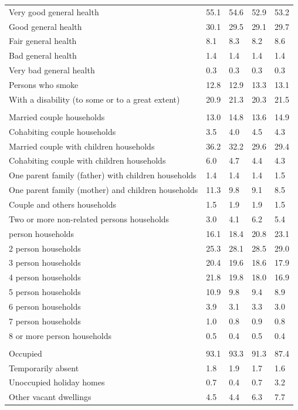 \documentclass{article}
\begin{document}
\begin{table}[h]
\begin{tabular}{KTTTT}
    \hline
Very good general health & 55.1& 54.6&52.9& 53.2\\
Good general health & 30.1& 29.5& 29.1& 29.7\\
Fair general health & 8.1& 8.3&8.2& 8.6\\
Bad general health & 1.4& 1.4&1.4& 1.4\\
Very bad general health & 0.3& 0.3&0.3& 0.3\\
    \hline
Persons who smoke & 12.8& 12.9&13.3& 13.1\\
    \hline
With a disability (to some or to a great extent) & 20.9& 21.3&20.3& 21.5\\
\hline
    \\ 
    \hline
Married couple households & 13.0& 14.8& 13.6& 14.9\\
Cohabiting couple households & 3.5& 4.0& 4.5& 4.3\\
Married couple with children households & 36.2& 32.2& 29.6& 29.4\\
Cohabiting couple with children households & 6.0& 4.7& 4.4& 4.3\\
One parent family (father) with  children households & 1.4& 1.4& 1.4& 1.5\\
One parent family (mother) and children households & 11.3&  9.8&  9.1&  8.5\\
Couple and others households  & 1.5& 1.9& 1.9& 1.5\\
Two or more non-related persons households & 3.0& 4.1& 6.2& 5.4\\
     person households & 16.1& 18.4& 20.8& 23.1\\
2 person households & 25.3& 28.1& 28.5& 29.0\\
3 person households & 20.4& 19.6& 18.6& 17.9\\
4 person households & 21.8& 19.8& 18.0& 16.9\\
5 person households & 10.9&  9.8&  9.4&  8.9\\
6 person households & 3.9& 3.1& 3.3& 3.0\\
7 person households & 1.0& 0.8& 0.9& 0.8\\
8 or more person households & 0.5& 0.4& 0.5& 0.4\\
\hline
    \\ 
    \hline
Occupied & 93.1& 93.3& 91.3& 87.4\\
Temporarily absent & 1.8& 1.9& 1.7& 1.6\\
Unoccupied holiday homes & 0.7& 0.4& 0.7& 3.2\\
Other vacant dwellings & 4.5& 4.4& 6.3& 7.7\\
\hline
\end{tabular}
\end{table}
\end{document}
